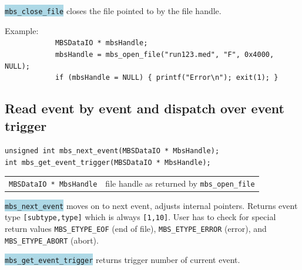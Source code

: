 \documentclass[10pt,a4paper]{article}
\newcommand{\blue}[1]{\colorbox{lightblue}{\texttt{#1}}}
\newenvironment{yellowboxed}
	{\begin{Sbox}\begin{minipage}[t]}
	{\end{minipage}\end{Sbox}\colorbox{yellow}{\TheSbox}}
\newenvironment{blueboxed}
	{\begin{Sbox}\begin{minipage}[t]}
	{\end{minipage}\end{Sbox}\colorbox{lightblue}{\TheSbox}}
\begin{document}
\blue{mbs\_close\_file} closes the file pointed to by the file handle.
\vspace{5mm}

\begin{yellowboxed}{\linewidth}
Example:\\
\verb+            MBSDataIO * mbsHandle;+\\
\verb+            mbsHandle = mbs_open_file("run123.med", "F", 0x4000, NULL);+\\
\verb+            if (mbsHandle = NULL) { printf("Error\n"); exit(1); }+\\
\end{yellowboxed}\vspace{5mm}
\newpage
\subsection{Read event by event and dispatch over event trigger}\vspace{3mm}
\begin{center}
\begin{blueboxed}{.7\linewidth}
	\verb+unsigned int mbs_next_event(MBSDataIO * MbsHandle);+\\
	\verb+int mbs_get_event_trigger(MBSDataIO * MbsHandle);+
\end{blueboxed}
\end{center}
\begin{center}
\begin{tabular}{ll}
\verb+MBSDataIO * MbsHandle+	& file handle as returned by \verb+mbs_open_file+\\
\end{tabular}
\end{center}
\blue{mbs\_next\_event} moves on to next event, adjusts internal pointers.
Returns event type \verb+[subtype,type]+ which is always \verb+[1,10]+.
User has to check for special return values \verb+MBS_ETYPE_EOF+ (end of file),
\verb+MBS_ETYPE_ERROR+ (error), and \verb+MBS_ETYPE_ABORT+ (abort).

\blue{mbs\_get\_event\_trigger} returns trigger number of current event.
\vspace{5mm}
\end{document}
